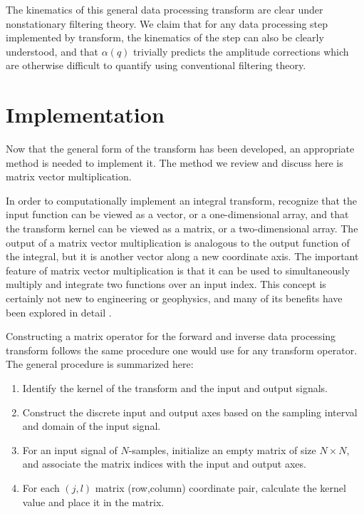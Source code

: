 The kinematics of this general data processing transform are clear under nonstationary filtering theory.
We claim that for any data processing step implemented by transform, the kinematics of the step can also be clearly understood, and that $\alpha \left( q \right)$ trivially predicts the amplitude corrections which are otherwise difficult to quantify using conventional filtering theory.  


\section{Implementation}

\label{sec:DPTa}
Now that the general form of the transform has been developed, an appropriate method is needed to implement it.
The method we review and discuss here is matrix vector multiplication.

In order to computationally implement an integral transform, recognize that the input function can be viewed as a vector, or a one-dimensional array, and that the transform kernel can be viewed as a matrix, or a two-dimensional array.
The output of a matrix vector multiplication is analogous to the output function of the integral, but it is another vector along a new coordinate axis.
The important feature of matrix vector multiplication is that it can be used to simultaneously multiply and integrate two functions over an input index.
This concept is certainly not new to engineering or geophysics, and many of its benefits have been explored in detail \citep{claerbout92}.

Constructing a matrix operator for the forward and inverse data processing transform follows the same procedure one would use for any transform operator.  The general procedure is summarized here:
\begin{enumerate}
\item Identify the kernel of the transform and the input and output signals.
\item Construct the discrete input and output axes based on the sampling interval and domain of the input signal.
\item For an input signal of $N$-samples, initialize an empty matrix of size $N \times N$, and associate the matrix indices with the input and output axes.
\item For each $\left( j, l \right)$ matrix (row,column) coordinate pair, calculate the kernel value and place it in the matrix.  
\end{enumerate}

